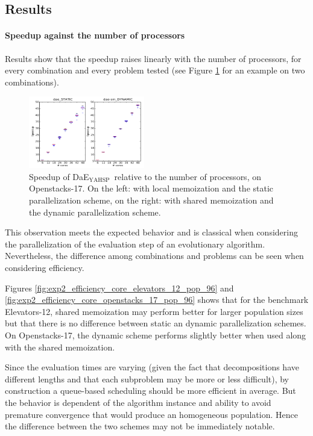 \documentclass{sig-alternate}
\newcommand{\DAEYAHSP}{{\sc DaE$_{\text{YAHSP}}$}}
\newcommand{\OPENSTACKS}{{\sc Openstacks}}
\newcommand{\ELEVATORS}{{\sc Elevators}}
\begin{document}
\subsection{Results}
\label{section:results}

\paragraph{Speedup against the number of processors}
Results show that the speedup raises linearly with the number of processors, for every combination and every problem tested (see Figure \ref{fig:exp2_speedup_core_openstack_17_pop_96_nosm-static_vs_sm-dynamic} for an example on two combinations).

\begin{figure}[htpb]
\begin{center}
\includegraphics[width=0.45\textwidth]{images/EXP2_Speed_up_IPC6_TEMPO_OPENSTACKS_17_S96_nosm-static_sm_vs_dynamic.pdf}
\caption{Speedup of \DAEYAHSP\ relative to the number of processors, on \OPENSTACKS-17.
On the left: with local memoization and the static parallelization scheme, on the right: with shared memoization and the dynamic parallelization scheme.}
\label{fig:exp2_speedup_core_openstack_17_pop_96_nosm-static_vs_sm-dynamic}
\end{center}
\end{figure}

This observation meets the expected behavior and is classical when considering the parallelization of the evaluation step of an evolutionary algorithm. Nevertheless, the difference among combinations and problems can be seen when considering efficiency.

Figures \ref{fig:exp2_efficiency_core_elevators_12_pop_96} and
\ref{fig:exp2_efficiency_core_openstacks_17_pop_96} shows that for the
benchmark \ELEVATORS-12, shared memoization may perform better for larger
population sizes but that there is no difference between static an dynamic
parallelization schemes. On \OPENSTACKS-17, the dynamic scheme performs
slightly better when used along with the shared memoization.

Since the evaluation times are varying (given the fact that decompositions have
different lengths and that each subproblem may be more or less difficult), by
construction a queue-based scheduling should be more efficient in
average. But the behavior is dependent of the algorithm instance
and ability to avoid premature convergence that would
produce an homogeneous population. Hence the difference between the two
schemes may not be immediately notable.
\end{document}
